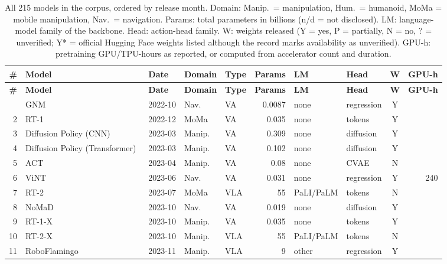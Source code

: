 \begin{longtable}{@{}r p{3.55cm} l l l r l l c r@{}}
\caption{All 215 models in the corpus, ordered by release month. Domain: Manip.\ = manipulation, Hum.\ = humanoid, MoMa = mobile manipulation, Nav.\ = navigation. Params: total parameters in billions (n/d = not disclosed). LM: language-model family of the backbone. Head: action-head family. W: weights released (Y = yes, P = partially, N = no, ? = unverified; Y* = official Hugging Face weights listed although the record marks availability as unverified). GPU-h: pretraining GPU/TPU-hours as reported, or computed from accelerator count and duration.\label{tab:models}}\\
\toprule
\textbf{\#} & \textbf{Model} & \textbf{Date} & \textbf{Domain} & \textbf{Type} & \textbf{Params} & \textbf{LM} & \textbf{Head} & \textbf{W} & \textbf{GPU-h}\\
\midrule
\endfirsthead
\toprule
\textbf{\#} & \textbf{Model} & \textbf{Date} & \textbf{Domain} & \textbf{Type} & \textbf{Params} & \textbf{LM} & \textbf{Head} & \textbf{W} & \textbf{GPU-h}\\
\midrule
\endhead
\bottomrule
\endfoot
1 & GNM~\cite{ax221003370} & 2022-10 & Nav. & VA & 0.0087 & none & regression & Y & \\
2 & RT-1~\cite{ax221206817} & 2022-12 & MoMa & VA & 0.035 & none & tokens & Y & \\
3 & Diffusion Policy (CNN)~\cite{ax230304137} & 2023-03 & Manip. & VA & 0.309 & none & diffusion & Y & \\
4 & Diffusion Policy (Transformer)~\cite{ax230304137} & 2023-03 & Manip. & VA & 0.102 & none & diffusion & Y & \\
5 & ACT~\cite{ax230413705} & 2023-04 & Manip. & VA & 0.08 & none & CVAE & N & \\
6 & ViNT~\cite{ax230614846} & 2023-06 & Nav. & VA & 0.031 & none & regression & Y & 240\\
7 & RT-2~\cite{ax230715818} & 2023-07 & MoMa & VLA & 55 & PaLI/PaLM & tokens & N & \\
8 & NoMaD~\cite{ax231007896} & 2023-10 & Nav. & VA & 0.019 & none & diffusion & Y & \\
9 & RT-1-X~\cite{ax231008864} & 2023-10 & Manip. & VA & 0.035 & none & tokens & Y & \\
10 & RT-2-X~\cite{ax231008864} & 2023-10 & Manip. & VLA & 55 & PaLI/PaLM & tokens & N & \\
11 & RoboFlamingo~\cite{ax231101378} & 2023-11 & Manip. & VLA & 9 & other & regression & Y & \\

\end{longtable}
